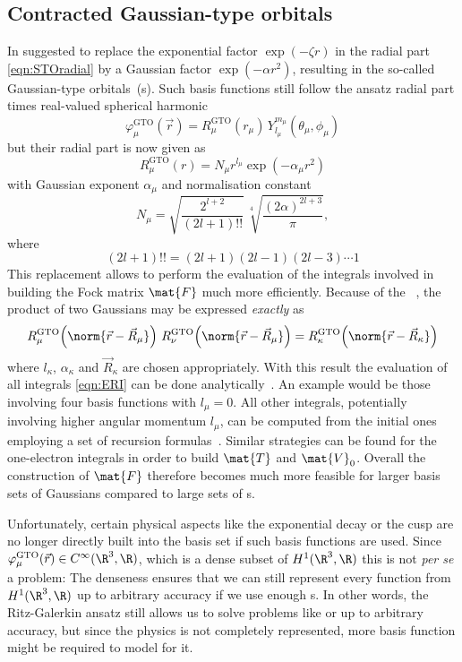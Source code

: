 \subsection{Contracted Gaussian-type orbitals}
\label{sec:cGTO}

In \citeyear{Boys1950} \citeauthor{Boys1950} \cite{Boys1950} suggested to replace
the exponential factor $\exp(- \zeta r)$ in the radial part \eqref{eqn:STOradial}
by a Gaussian factor $\exp(-\alpha r^2)$,
resulting in the so-called Gaussian-type orbitals~({\GTO}s).
Such \GTO basis functions still follow the ansatz radial part times real-valued spherical harmonic
\begin{equation}
	\varphi^\text{GTO}_\mu(\vec{r}) =
	R^\text{GTO}_\mu(r_\mu) \, Y_{l_\mu}^{m_\mu}(\theta_\mu, \phi_\mu)
	\label{eqn:ACproductCgto}
\end{equation}
but their radial part is now given as
\begin{equation}
	R^\text{GTO}_\mu(r) = N_\mu r^{l_\mu} \exp(-\alpha_\mu r^2)
	\label{eqn:GTOradial}
\end{equation}
with Gaussian exponent $\alpha_\mu$ and normalisation constant
\[
	N_\mu =  \sqrt{\frac{2^{l+2}}{(2l+1)!!}} \, \sqrt[4]{\frac{(2\alpha)^{2l+3}}{\pi}},
\]
where
\[
	(2l+1)!! = (2l+1)(2l-1)(2l-3) \cdots 1
\]
This replacement allows to perform the
evaluation of the integrals involved in building the Fock matrix $\mat{F}$
much more efficiently.
Because of the %
~\cite{Boys1950,Szabo1996,Besalu2011},
the product of two Gaussians may be expressed \emph{exactly} as
\[
	R^\text{GTO}_\mu\!\left( \norm{\vec{r} - \vec{R}_\mu}\right)
	\,
	R^\text{GTO}_\nu\!\left( \norm{\vec{r} - \vec{R}_\mu}\right)
	= R^\text{GTO}_\kappa\!\left( \norm{\vec{r} - \vec{R}_\kappa}\right)
\]
where $l_\kappa$, $\alpha_\kappa$ and $\vec{R}_\kappa$ are chosen appropriately.
With this result the evaluation of all \ERI integrals \eqref{eqn:ERI}
can be done analytically~\cite{Boys1950}.
An example would be those involving four basis functions with $l_\mu = 0$.
All other \ERI integrals, potentially involving higher angular momentum $l_\mu$,
can be computed from the initial ones employing
a set of recursion formulas~\cite{Gill1994}.
Similar strategies can be found for the one-electron integrals
in order to build $\mat{T}$ and $\mat{V}_0$.
Overall the construction of $\mat{F}$ therefore becomes much more
feasible for larger basis sets of Gaussians compared to large sets of {\STO}s.

Unfortunately, certain physical aspects like the exponential decay
or the cusp are no longer directly built into the basis set
if such \GTO basis functions are used.
Since $\varphi^\text{GTO}_\mu(\vec{r}) \in C^\infty(\R^3, \R)$,
which is a dense subset of $H^1(\R^3, \R)$
this is not \textit{per se} a problem:
The denseness ensures that we can still represent every function
from $H^1(\R^3, \R)$ up to arbitrary accuracy if we use enough {\GTO}s.
In other words, the Ritz-Galerkin ansatz still allows us to
solve problems like \HF or \FCI up to arbitrary accuracy,
but since the physics is not completely represented,
more basis function might be required to model for it.

